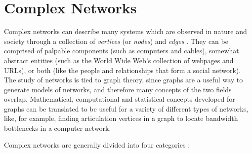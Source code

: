 \chapter{Complex Networks}
\label{chap:complexnetworks}


%


Complex networks can describe many systems which are observed in nature and society through a collection of \textit{vertices} (or \textit{nodes}) and \textit{edges} \cite{newmannetworks}.
They can be comprised of palpable components (such as computers and cables), somewhat abstract entities (such as the World Wide Web's collection of webpages and URLs), or both (like the people and relationships that form a social network).
The study of networks is tied to graph theory, since graphs are a useful way to generate models of networks, and therefore many concepts of the two fields overlap.
Mathematical, computational and statistical concepts developed for graphs can be translated to be useful for a variety of different types of networks, like, for example, finding articulation vertices in a graph to locate bandwidth bottlenecks in a computer network.

Complex networks are generally divided into four categories \cite{newmannetworks}:

